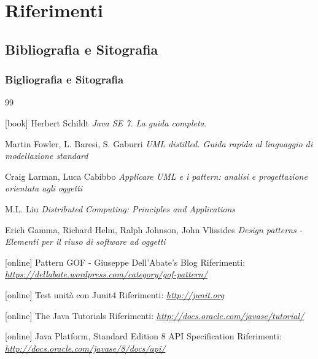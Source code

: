 \section {Riferimenti}
\subsection {Bibliografia e Sitografia}
\begin {frame} [allowframebreaks] 
  \frametitle {Bigliografia e Sitografia}
  \begin {thebibliography}{99}
   {\tiny 
     [book]
      Herbert Schildt
     \newblock \emph{Java SE 7. La guida completa.} 

       Martin Fowler, L. Baresi, S. Gaburri 
     \newblock \emph{UML distilled. Guida rapida al linguaggio di modellazione standard} 

      Craig Larman, Luca Cabibbo
     \newblock \emph{Applicare UML e i pattern: analisi e progettazione orientata agli oggetti} 

      M.L. Liu
     \newblock \emph{Distributed Computing: Principles and Applications} 

      Erich Gamma, Richard Helm, Ralph Johnson, John Vlissides
     \newblock \emph{Design patterns - Elementi per il riuso di software ad oggetti} 
      
     [online]
      Pattern GOF - Giuseppe Dell'Abate's Blog
     \newblock Riferimenti: \emph{\url{https://dellabate.wordpress.com/category/gof-pattern/ }}

     [online]
      Test unità con Junit4
     \newblock Riferimenti: \emph{\url{http://junit.org }}

     [online]
      The Java Tutorials 
     \newblock Riferimenti: \emph{\url{http://docs.oracle.com/javase/tutorial/ }}

     [online]
      Java Platform, Standard Edition 8 API Specification 
     \newblock Riferimenti: \emph{\url{http://docs.oracle.com/javase/8/docs/api/ }}

}
\end{thebibliography}
\end{frame}
